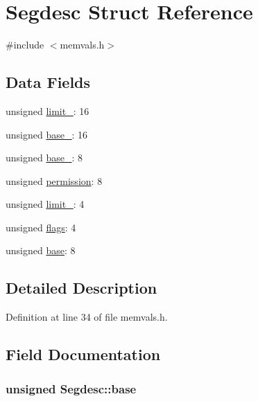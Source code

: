 \hypertarget{structSegdesc}{\section{\-Segdesc \-Struct \-Reference}
\label{structSegdesc}
}


{\ttfamily \#include $<$memvals.\-h$>$}

\subsection*{\-Data \-Fields}
\begin{DoxyCompactItemize}
\item 
unsigned \hyperlink{structSegdesc_aa98356a03ede9a64a2a866c63d751b10}{limit\-\_}\-: 16
\item 
unsigned \hyperlink{structSegdesc_a9ef72e5343428076ae56aadda868e6d6}{base\-\_}\-: 16
\item 
unsigned \hyperlink{structSegdesc_a293c20d519e6ab9e38720e32016f7d31}{base\-\_}\-: 8
\item 
unsigned \hyperlink{structSegdesc_a2ab463dbb1b304bf3ab79ba0abaf4eaa}{permission}\-: 8
\item 
unsigned \hyperlink{structSegdesc_a6ea96b5b37b07766d86d62c166363c21}{limit\-\_}\-: 4
\item 
unsigned \hyperlink{structSegdesc_a88cc0fd4e0fc4467546577095c0ffe3e}{flags}\-: 4
\item 
unsigned \hyperlink{structSegdesc_a9f663ff44e5b7c7bffd2b5b72654d72e}{base}\-: 8
\end{DoxyCompactItemize}


\subsection{\-Detailed \-Description}


\-Definition at line 34 of file memvals.\-h.



\subsection{\-Field \-Documentation}
\hypertarget{structSegdesc_a9f663ff44e5b7c7bffd2b5b72654d72e}{
\subsubsection[{base}]{\setlength{\rightskip}{0pt plus 5cm}unsigned {\bf \-Segdesc\-::base}}}\label{structSegdesc_a9f663ff44e5b7c7bffd2b5b72654d72e}


